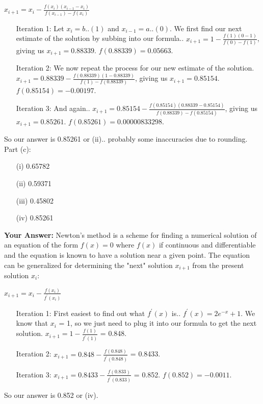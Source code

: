 \documentclass[12pt]{report}
\begin{document}
\begin{center}
$x_{i+1} = x_i - \frac{f(x_i)(x_{i-1}-x_i)}{f(x_{i-1})-f(x_i)}$
\end{center}
\begin{itemize}
\item[Iteration 1:] Let $x_i = b..(1)$ and $x_{i-1} = a..(0)$. We first find our next estimate of the solution by subbing into our formula.. $x_{i+1} = 1 - \frac{f(1)(0-1)}{f(0)-f(1)}$, giving us $x_{i+1} = 0.88339$. $f(0.88339) = 0.05663$.
\item[Iteration 2:] We now repeat the process for our new estimate of the solution. $x_{i+1} = 0.88339 - \frac{f(0.88339)(1-0.88339)}{f(1)-f(0.88339)}$, giving us $x_{i+1} = 0.85154$. $f(0.85154) = -0.00197$.
\item[Iteration 3:] And again.. $x_{i+1} = 0.85154 - \frac{f(0.85154)(0.88339-0.85154)}{f(0.88339)-f(0.85154)}$, giving us $x_{i+1} = 0.85261$. $f(0.85261) = 0.00000833298$.
\end{itemize}
So our answer is 0.85261 or (ii).. probably some inaccuracies due to rounding.
\newline
\newline
\newline
Part (c):
\begin{itemize}
\item[(i)] 0.65782
\item[(ii)] 0.59371
\item[(iii)] 0.45802
\item[(iv)] 0.85261
\end{itemize}
\textbf{Your Answer:}
\newline
Newton's method is a scheme for finding a numerical solution of an equation of the form $f(x) = 0 $ where $f(x)$ if continuous and differentiable and the equation is known to have a solution near a given point. The equation can be generalized for determining the "next" solution $x_{i+1}$ from the present solution $x_i$:
\begin{center}
$x_{i+1} = x_i - \frac{f(x_i)}{f^\prime(x_i)}$
\end{center}
\begin{itemize}
\item[Iteration 1:] First easiest to find out what $f^\prime(x)$ is.. $f^\prime(x) = 2e^{-x} + 1$. We know that $x_i$ = 1, so we just need to plug it into our formula to get the next solution. $x_{i+1} = 1 - \frac{f(1)}{f^\prime(1)}$ = 0.848.
\item[Iteration 2:] $x_{i+1} = 0.848 - \frac{f(0.848)}{f^\prime(0.848)}$ = 0.8433.
\item[Iteration 3:] $x_{i+1} = 0.8433 - \frac{f(0.833)}{f^\prime(0.833)}$ = 0.852. $f(0.852) = -0.0011$.
\end{itemize}
So our answer is 0.852 or (iv).
\newline
\newline
\end{document}
